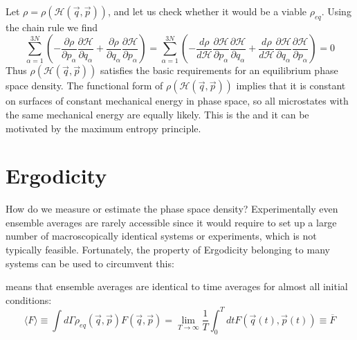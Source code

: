 \documentclass[12pt, a4paper, oneside, openright, titlepage]{book}
\begin{document}
Let $\rho = \rho(\mathcal{H}(\vec{q},\vec{p}))$, and let us check whether it would be a viable $\rho_{eq}$. Using the chain rule we find \begin{equation*}
    \sum_{\alpha=1}^{3N}\left(-\frac{\partial \rho}{\partial p_{\alpha}}\frac{\partial \mathcal{H}}{\partial q_{\alpha}} + \frac{\partial \rho}{\partial q_{\alpha}}\frac{\partial \mathcal{H}}{\partial p_{\alpha}}\right) = \sum_{\alpha=1}^{3N}\left(-\frac{d\rho}{d\mathcal{H}}\frac{\partial \mathcal{H}}{\partial p_{\alpha}}\frac{\partial \mathcal{H}}{\partial q_{\alpha}} + \frac{d\rho}{d\mathcal{H}}\frac{\partial \mathcal{H}}{\partial q_{\alpha}}\frac{\partial \mathcal{H}}{\partial p_{\alpha}}\right)  = 0
\end{equation*}
Thus $\rho(\mathcal{H}(\vec{q},\vec{p}))$ satisfies the basic requirements for an equilibrium phase space density. The functional form of $\rho(\mathcal{H}(\vec{q},\vec{p}))$ implies that it is constant on surfaces of constant mechanical energy in phase space, so all microstates with the same mechanical energy are equally likely. This is the  and it can be motivated by the maximum entropy principle.




\section{Ergodicity}


How do we measure or estimate the phase space density? Experimentally even ensemble averages are rarely accessible since it would require to set up a large number of macroscopically identical systems or experiments, which is not typically feasible. Fortunately, the property of Ergodicity belonging to many systems can be used to circumvent this:

\begin{defn}
     means that ensemble averages are identical to time averages for almost all initial conditions: \begin{equation*}
        \langle F\rangle \equiv \int d\Gamma\rho_{eq}(\vec{q},\vec{p})F(\vec{q},\vec{p}) = \lim\limits_{T\rightarrow \infty}\frac{1}{T}\int_0^TdtF(\vec{q}(t),\vec{p}(t)) \equiv \overline{F}
    \end{equation*}
\end{defn}
\end{document}
